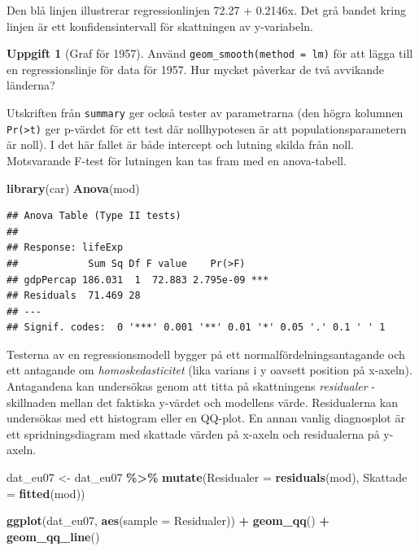\documentclass[
]{book}
\newenvironment{Shaded}{\begin{snugshade}}{\end{snugshade}}
\newcommand{\AttributeTok}[1]{\textcolor[rgb]{0.13,0.29,0.53}{#1}}
\newcommand{\FunctionTok}[1]{\textcolor[rgb]{0.13,0.29,0.53}{\textbf{#1}}}
\newcommand{\NormalTok}[1]{#1}
\newcommand{\OtherTok}[1]{\textcolor[rgb]{0.56,0.35,0.01}{#1}}
\newcommand{\SpecialCharTok}[1]{\textcolor[rgb]{0.81,0.36,0.00}{\textbf{#1}}}
\theoremstyle{definition}
\theoremstyle{definition}
\theoremstyle{definition}
\newtheorem{exercise}{Uppgift}[chapter]
\theoremstyle{definition}
\theoremstyle{remark}
\begin{document}
Den blå linjen illustrerar regressionlinjen 72.27 + 0.2146x. Det grå bandet kring linjen är ett konfidensintervall för skattningen av y-variabeln.

\begin{exercise}[Graf för 1957]
Använd \texttt{geom\_smooth(method\ =\ lm)} för att lägga till en regressionslinje för data för 1957. Hur mycket påverkar de två avvikande länderna?
\end{exercise}

Utskriften från \texttt{summary} ger också tester av parametrarna (den högra kolumnen \texttt{Pr(\textgreater{}\textbar{}t\textbar{})} ger p-värdet för ett test där nollhypotesen är att populationsparametern är noll). I det här fallet är både intercept och lutning skilda från noll. Motsvarande F-test för lutningen kan tas fram med en anova-tabell.

\begin{Shaded}
\begin{Highlighting}[]
\FunctionTok{library}\NormalTok{(car)}
\FunctionTok{Anova}\NormalTok{(mod)}
\end{Highlighting}
\end{Shaded}

\begin{verbatim}
## Anova Table (Type II tests)
## 
## Response: lifeExp
##            Sum Sq Df F value    Pr(>F)    
## gdpPercap 186.031  1  72.883 2.795e-09 ***
## Residuals  71.469 28                      
## ---
## Signif. codes:  0 '***' 0.001 '**' 0.01 '*' 0.05 '.' 0.1 ' ' 1
\end{verbatim}

Testerna av en regressionsmodell bygger på ett normalfördelningsantagande och ett antagande om \emph{homoskedasticitet} (lika varians i y oavsett position på x-axeln). Antagandena kan undersökas genom att titta på skattningens \emph{residualer} - skillnaden mellan det faktiska y-värdet och modellens värde. Residualerna kan undersökas med ett histogram eller en QQ-plot. En annan vanlig diagnosplot är ett spridningsdiagram med skattade värden på x-axeln och residualerna på y-axeln.

\begin{Shaded}
\begin{Highlighting}[]
\NormalTok{dat\_eu07 }\OtherTok{\textless{}{-}}\NormalTok{ dat\_eu07 }\SpecialCharTok{\%\textgreater{}\%} 
  \FunctionTok{mutate}\NormalTok{(}\AttributeTok{Residualer =} \FunctionTok{residuals}\NormalTok{(mod),}
         \AttributeTok{Skattade =} \FunctionTok{fitted}\NormalTok{(mod))}

\FunctionTok{ggplot}\NormalTok{(dat\_eu07, }\FunctionTok{aes}\NormalTok{(}\AttributeTok{sample =}\NormalTok{ Residualer)) }\SpecialCharTok{+} \FunctionTok{geom\_qq}\NormalTok{() }\SpecialCharTok{+} \FunctionTok{geom\_qq\_line}\NormalTok{()}
\end{Highlighting}
\end{Shaded}
\end{document}
